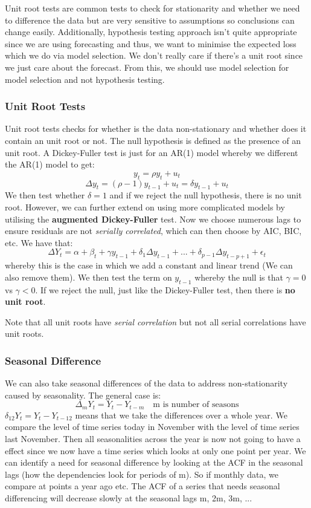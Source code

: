 \documentclass[11pt, oneside]{article}
\theoremstyle{definition}
\begin{document}
 Unit root tests are common tests to check for stationarity and whether we need to difference the data but are very sensitive to assumptions so conclusions can change easily. Additionally, hypothesis testing approach isn't quite appropriate since we are using forecasting and thus, we want to minimise the expected loss which we do via model selection. We don't really care if there's a unit root since we just care about the forecast. From this, we should use model selection for model selection and not hypothesis testing.

 \subsubsection{Unit Root Tests}
 Unit root tests checks for whether is the data non-stationary and whether does it contain an unit root or not. The null hypothesis is defined as the presence of an unit root. A Dickey-Fuller test is just for an AR(1) model whereby we different the AR(1) model to get:
$$
y_t = \rho y_t + u_t
$$
$$
\Delta y_t = (\rho - 1)y_{t-1} + u_t = \delta y_{t-1} + u_t
$$
We then test whether $\delta = 1$ and if we reject the null hypothesis, there is no unit root. However, we can further extend on using more complicated models by utilising the \textbf{augmented Dickey-Fuller} test. Now we choose numerous lags to ensure residuals are not \textit{serially correlated}, which can then choose by AIC, BIC, etc. We have that:
$$
\Delta Y_t = \alpha + \beta_t + \gamma y_{t-1} + \delta_1 \Delta y_{t-1} + ... + \delta_{p-1} \Delta y_{t-p+1} + \epsilon_t
$$
whereby this is the case in which we add a constant and linear trend (We can also remove them). We then test the term on $y_{t-1}$ whereby the null is that $\gamma = 0$ vs $\gamma < 0$. If we reject the null, just like the Dickey-Fuller test, then there is \textbf{no unit root}.

 Note that all unit roots have \textit{serial correlation} but not all serial correlations have unit roots.

\subsubsection{Seasonal Difference}
 We can also take seasonal differences of the data to address non-stationarity caused by seasonality. The general case is:
$$
\Delta_m Y_t = Y_t - Y_{t-m} \quad \text{m is number of seasons}
$$
$\delta_{12} Y_t = Y_t - Y_{t-12}$ means that we take the differences over a whole year. We compare the level of time series today in November with the level of time series last November. Then all seasonalities across the year is now not going to have a effect since we now have a time series which looks at only one point per year. We can identify a need for seasonal difference by looking at the ACF in the seasonal lags (how the dependencies look for periods of m). So if monthly data, we compare at points a year ago etc. The ACF of a series that needs seasonal differencing will decrease slowly at the seasonal lags m, 2m, 3m, ...
\end{document}
